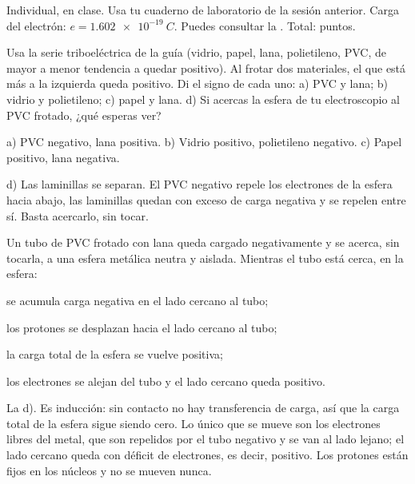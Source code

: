 \documentclass[11pt]{article}
\begin{document}
\encabezado

\begin{instrucciones}
Individual, en clase. Usa tu cuaderno de laboratorio de la sesión anterior. Carga del
electrón: $e = \qty{1,602e-19}{C}$. Puedes consultar la .
Total: \totalpuntos{} puntos.
\end{instrucciones}

\begin{preguntas}

\pregunta[1] Usa la serie triboeléctrica de la guía (vidrio, papel, lana, polietileno, PVC, de
mayor a menor tendencia a quedar positivo). Al frotar dos materiales, el que está más a la
izquierda queda positivo. Di el signo de cada uno: a) PVC y lana; b) vidrio y polietileno;
c) papel y lana. d) Si acercas la esfera de tu electroscopio al PVC frotado, ¿qué esperas ver?
\begin{solucion}[4.5cm]
a) PVC negativo, lana positiva. \quad b) Vidrio positivo, polietileno negativo. \quad
c) Papel positivo, lana negativa.

d) Las laminillas se separan. El PVC negativo repele los electrones de la esfera hacia abajo,
las laminillas quedan con exceso de carga negativa y se repelen entre sí. Basta acercarlo, sin
tocar.
\end{solucion}

\pregunta[1] Un tubo de PVC frotado con lana queda cargado negativamente y se acerca, sin
tocarla, a una esfera metálica neutra y aislada. Mientras el tubo está cerca, en la esfera:
\begin{opciones}
  \item se acumula carga negativa en el lado cercano al tubo;
  \item los protones se desplazan hacia el lado cercano al tubo;
  \item la carga total de la esfera se vuelve positiva;
  \item los electrones se alejan del tubo y el lado cercano queda positivo.
\end{opciones}
\begin{solucion}[4cm]
La d). Es inducción: sin contacto no hay transferencia de carga, así que la carga total de la
esfera sigue siendo cero. Lo único que se mueve son los electrones libres del metal, que son
repelidos por el tubo negativo y se van al lado lejano; el lado cercano queda con déficit de
electrones, es decir, positivo. Los protones están fijos en los núcleos y no se mueven nunca.
\end{solucion}


\end{preguntas}
\end{document}
